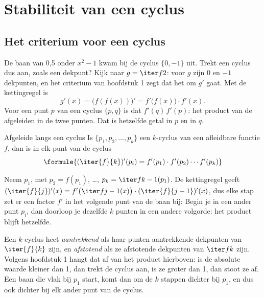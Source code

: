 \section{Stabiliteit van een cyclus}

\subsection{Het criterium voor een cyclus}

De baan van 0,5 onder $x^2 - 1$ kwam bij de cyclus $\{0, -1\}$ uit. Trekt een cyclus dus aan, zoals een dekpunt? Kijk naar $g = \iter f2$: voor $g$ zijn 0 en $-1$ dekpunten, en het criterium van hoofdstuk 1 zegt dat het om $g'$ gaat. Met de kettingregel is
\[
g'(x) = \bigl(f(f(x))\bigr)' = f'\bigl(f(x)\bigr) \cdot f'(x) .
\]
Voor een punt $p$ van een cyclus $\{p, q\}$ is dat $f'(q)\,f'(p)$: het product van de afgeleiden in de twee punten. Dat is hetzelfde getal in $p$ en in $q$.

\begin{theorie}
\begin{stelling}{Afgeleide langs een cyclus}
Is $\{p_1, p_2, \ldots, p_k\}$ een $k$-cyclus van een afleidbare functie $f$, dan is in elk punt van de cyclus
\[
\formule{(\iter{f}{k})'(p_i) = f'(p_1) \cdot f'(p_2) \cdots f'(p_k)}
\]
\end{stelling}

\begin{bewijs}
Neem $p_1$, met $p_2 = f(p_1)$, \ldots, $p_k = \iter f{k-1}(p_1)$. De kettingregel geeft $(\iter{f}{j})'(x) = f'\bigl(\iter f{j-1}(x)\bigr) \cdot (\iter{f}{j-1})'(x)$, dus elke stap zet er een factor $f'$ in het volgende punt van de baan bij:
Begin je in een ander punt $p_i$, dan doorloop je dezelfde $k$ punten in een andere volgorde: het product blijft hetzelfde.
\end{bewijs}
\end{theorie}

Een $k$-cyclus heet \textit{aantrekkend} als haar punten aantrekkende dekpunten van $\iter{f}{k}$ zijn, en \textit{afstotend} als ze afstotende dekpunten van $\iter fk$ zijn. Volgens hoofdstuk 1 hangt dat af van het product hierboven: is de absolute waarde kleiner dan 1, dan trekt de cyclus aan, is ze groter dan 1, dan stoot ze af. Een baan die vlak bij $p_1$ start, komt dan om de $k$ stappen dichter bij $p_1$, en dus ook dichter bij elk ander punt van de cyclus.

